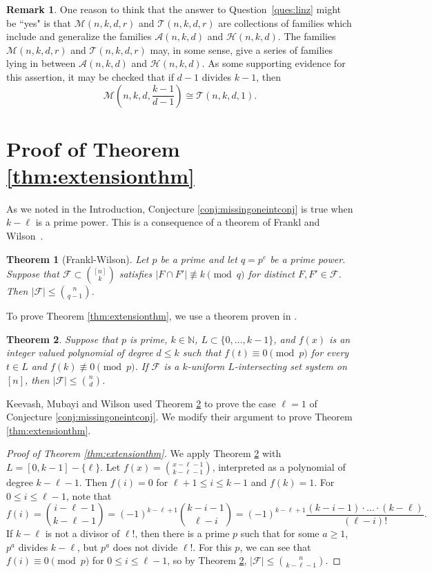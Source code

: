 \documentclass[12pt]{article}
\newtheorem{theorem}{Theorem}
\theoremstyle{definition}
\newtheorem{remark}{Remark}
\newcommand{\cH}{\mathcal{H}}
\newcommand{\cA}{\mathcal{A}}
\newcommand{\cF}{\mathcal{F}}
\newcommand{\cM}{\mathcal{M}}
\newcommand{\cT}{\mathcal{T}}
\begin{document}
\begin{remark}
One reason to think that the answer to Question~\ref{ques:linz} might be ``yes" is that $\cM(n, k, d, r)$ and $\cT(n, k, d, r)$ are collections of families which include and generalize the families $\cA(n, k, d)$ and $\cH(n, k, d)$. The families $\cM(n, k, d, r)$ and $\cT(n, k, d, r)$ may, in some sense, give a series of families lying in between $\cA(n, k, d)$ and $\cH(n, k, d)$. As some supporting evidence for this assertion, it may be checked that if $d-1$ divides $k-1$, then
\[\cM\left(n, k, d, \frac{k-1}{d-1}\right) \cong \cT(n, k, d, 1).\]

\end{remark}

\section{Proof of Theorem \ref{thm:extensionthm}}
As we noted in the Introduction, Conjecture \ref{conj:missingoneintconj} is true when $k-\ell$ is a prime power. This is a consequence of a theorem of Frankl and Wilson~\cite{FW}. 

\begin{theorem}[Frankl-Wilson]\label{thm:fwthm}
Let $p$ be a prime and let $q=p^e$ be a prime power. Suppose that $\cF\subset \binom{[n]}{k}$ satisfies $|F\cap F'| \not\equiv k\pmod{q}$ for distinct $F, F' \in \cF$. Then $|\cF| \le \binom{n}{q-1}$. 
\end{theorem}

To prove Theorem \ref{thm:extensionthm}, we use a theorem proven in \cite{KMW}. 
\begin{theorem}\label{thm:ell=1thm}
Suppose that $p$ is prime, $k\in \mathbb{N}$, $L\subset \{0, \ldots, k-1\}$, and $f(x)$ is an integer valued polynomial of degree $d \le k$ such that $f(t) \equiv 0\pmod{p}$ for every $t \in L$ and $f(k) \not\equiv 0 \pmod{p}$. If $\cF$ is a $k$-uniform $L$-intersecting set system on $[n]$, then $|\cF|\le \binom{n}{d}$. 
\end{theorem}

Keevash, Mubayi and Wilson \cite{KMW} used Theorem \ref{thm:ell=1thm} to prove the case $\ell = 1$ of Conjecture \ref{conj:missingoneintconj}. We modify their argument to prove Theorem \ref{thm:extensionthm}.

\begin{proof}[Proof of Theorem \ref{thm:extensionthm}]
We apply Theorem \ref{thm:ell=1thm} with $L = [0, k-1] - \{\ell\}$. Let $f(x) = \binom{x-\ell-1}{k-\ell-1}$, interpreted as a polynomial of degree $k-\ell-1$. Then $f(i) = 0$ for $\ell+1 \le i \le k - 1$ and $f(k) = 1$. For $0 \le i \le \ell - 1$, note that \[f(i) = \binom{i-\ell - 1}{k-\ell - 1} = (-1)^{k-\ell+1}\binom{k-i-1}{\ell - i} = (-1)^{k-\ell+1}\frac{(k-i-1)\cdot \ldots \cdot(k-\ell)}{(\ell - i)!}.\] If $k - \ell$ is not a divisor of $\ell!$, then there is a prime $p$ such that for some $a \ge 1$, $p^a$ divides $k-\ell$, but $p^a$ does not divide $\ell!$. For this $p$, we can see that $f(i) \equiv 0\pmod{p}$ for $0 \le i \le \ell - 1$, so by Theorem \ref{thm:ell=1thm}, $|\cF| \le \binom{n}{k-\ell-1}$. 
\end{proof}
\end{document}
